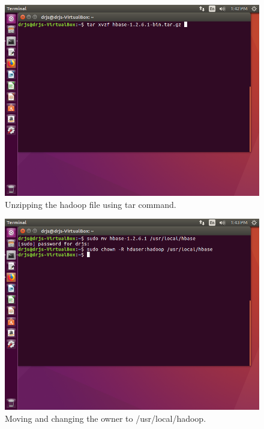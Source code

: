\documentclass[a4paper,10pt]{article}
\begin{document}
\begin{figure}[h]
	\includegraphics[scale=0.33,center]{2.png}
	\caption{Unzipping the hadoop file using tar command.}
	\label{fig:1}
\end{figure}	

\begin{figure}[h]
	\includegraphics[scale=0.33,center]{3.png}
	\caption{Moving and changing the owner to /usr/local/hadoop.}
	\label{fig:1}
\end{figure}
\end{document}
